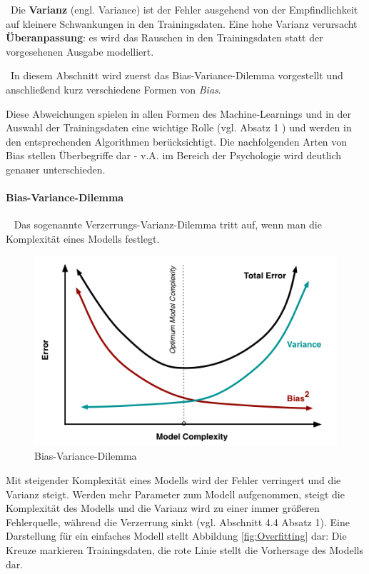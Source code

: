 ~\newline Die \textbf{Varianz} (engl. Variance) ist der Fehler ausgehend von der Empfindlichkeit auf kleinere Schwankungen in den Trainingsdaten. Eine hohe Varianz verursacht \textbf{Überanpassung}: es wird das Rauschen in den Trainingsdaten statt der vorgesehenen Ausgabe modelliert.


~\newline In diesem Abschnitt wird zuerst das Bias-Variance-Dilemma vorgestellt und anschließend kurz verschiedene Formen von \textit{Bias}. 

Diese Abweichungen spielen in allen Formen des Machine-Learnings und in der Auswahl der Trainingsdaten eine wichtige Rolle (vgl. \cite{BiasTypes} Absatz 1 ) und werden in den entsprechenden Algorithmen berücksichtigt. Die nachfolgenden Arten von Bias stellen Überbegriffe dar - v.A. im Bereich der Psychologie wird deutlich genauer unterschieden.
\paragraph{Bias-Variance-Dilemma} ~\newline
Das sogenannte Verzerrungs-Varianz-Dilemma tritt auf, wenn man die Komplexität eines Modells festlegt.
\begin{figure}[h]
	\begin{center}
		\includegraphics[width=0.6\linewidth]{Bilder/BiasVariance}
		\caption[Bias-Variance-Dilemma: \url{
			http://scott.fortmann-roe.com/docs/BiasVariance.html}]{Bias-Variance-Dilemma}
		\label{fig:BVDilemma}
	\end{center}
\end{figure}
Mit steigender Komplexität eines Modells wird der Fehler verringert und die Varianz steigt. Werden mehr Parameter zum Modell aufgenommen, steigt die Komplexität des Modells und die Varianz wird zu einer immer größeren Fehlerquelle, während die Verzerrung sinkt (vgl. \cite{BiasVarianceDilemma} Abschnitt 4.4 Absatz 1). Eine Darstellung für ein einfaches Modell stellt Abbildung \ref{fig:Overfitting} dar: Die Kreuze markieren Trainingsdaten, die rote Linie stellt die Vorhersage des Modells dar. 

